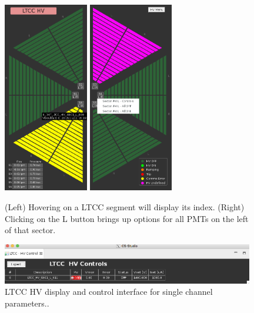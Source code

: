 \documentclass{article}
\begin{document}
\begin{figure}[ht]
  \centering
		\includegraphics[width=0.33\textwidth]{img/ltccHVhover}
		\includegraphics[width=0.33\textwidth]{img/ltccHVlr}
		\caption{	(Left) Hovering on a LTCC segment will display its index. (Right) Clicking on the L 
	button brings up options for all PMTs on the left of that sector.}
 		\label{fig:ltccHVactions}
\end{figure}

\clearpage

\begin{figure}[ht]
  \centering
		\includegraphics[width=0.98\textwidth]{img/singleHV}
		\caption{LTCC HV display and control interface  for single channel parameters..}
 		\label{fig:singleHV}
\end{figure}
\end{document}
